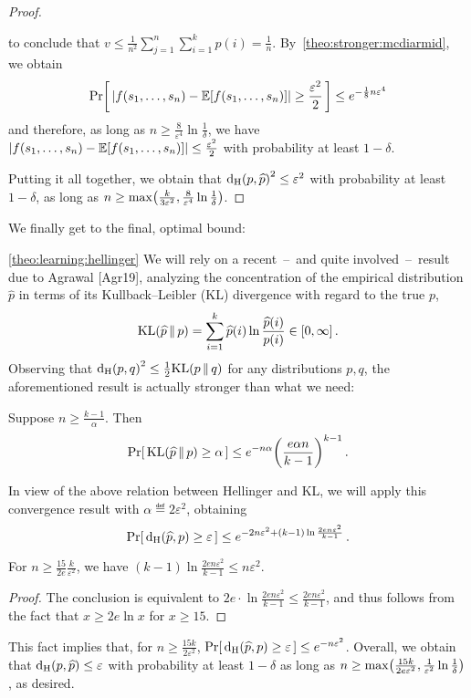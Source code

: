 \documentclass[10pt]{article}
\newcommand{\dst}{\varepsilon}
\newcommand{\ab}{k}
\newcommand{\ns}{n}
\begin{document}
\begin{proof}
\begin{itemize}
\[      \]
      to conclude that $v \leq \frac{1}{\ns^2} \sum_{j=1}^\ns \sum_{i=1}^\ab p(i)  = \frac{1}{\ns}$. By~\autoref{theo:stronger:mcdiarmid}, we obtain
      \[
          \probaOf{ \abs{f(s_1,\dots,s_\ns)-\expect{f(s_1,\dots,s_\ns)}} \geq \frac{\dst^2}{2} } \leq e^{-\frac{1}{8}\ns\dst^4}
      \]
      and therefore, as long as $\ns \geq \frac{8}{\dst^4}\ln\frac{1}{\delta}$, we have $\abs{f(s_1,\dots,s_\ns)-\expect{f(s_1,\dots,s_\ns)}} \leq \frac{\dst^2}{2}$ with probability at least $1-\delta$.
    \end{itemize}
    Putting it all together, we obtain that $\hellinger{p}{\widehat{p}}^2 \leq \dst^2$ with probability at least $1-\delta$, as long as $\ns \geq \max\mleft( \frac{\ab}{3\dst^2}, \frac{8}{\dst^4}\ln\frac{1}{\delta}\mright)$.
\end{proof}
\noindent We finally get to the final, optimal bound:
\begin{proofof}{\autoref{theo:learning:hellinger}}
We will rely on a recent~--~and quite involved~--~result due to Agrawal [Agr19], analyzing the concentration of the empirical distribution $\widehat{p}$ in terms of its Kullback--Leibler (KL) divergence with regard to the true $p$,
\[
    \kldiv{\widehat{p}}{p} = \sum_{i=1}^\ab \widehat{p}(i) \ln \frac{\widehat{p}(i)}{p(i)} \in[0,\infty]\,.
\]
Observing that $\hellinger{p}{q}^2 \leq \frac{1}{2} \kldiv{p}{q}$ for any distributions $p, q$, the aforementioned result is actually stronger than what we need:
\begin{theorem}
  Suppose $\ns \geq \frac{\ab-1}{\alpha}$. Then
  \[
      \probaOf{ \kldiv{\widehat{p}}{p} \geq \alpha } \leq e^{-\ns\alpha}\mleft(\frac{e\alpha\ns}{\ab-1}\mright)^{\ab-1}\,.
  \]
\end{theorem}
\noindent In view of the above relation between Hellinger and KL, we will apply this convergence result with $\alpha \eqdef 2\dst^2$, obtaining
  \[
      \probaOf{ \hellinger{\widehat{p}}{p} \geq \dst } \leq e^{-2\ns\dst^2 + (\ab-1)\ln\frac{2e\ns\dst^2}{\ab-1}}\,.
  \]
  \begin{fact}
      For $\ns \geq \frac{15}{2e}\frac{\ab}{\dst^2}$, we have $(\ab-1)\ln\frac{2e\ns\dst^2}{\ab-1}\leq \ns\dst^2$. 
  \end{fact}
  \begin{proof}
  The conclusion is equivalent to $2e\cdot\ln\frac{2e\ns\dst^2}{\ab-1}\leq \frac{2e\ns\dst^2}{\ab-1}$, and thus follows from the fact that $x\geq 2e \ln x$ for $x\geq 15$.
  \end{proof}
  \noindent This fact implies that, for $\ns \geq \frac{15\ab}{2\dst^2}$, $\probaOf{ \hellinger{\widehat{p}}{p} \geq \dst } \leq e^{-\ns\dst^2}$. Overall, we obtain that $\hellinger{p}{\widehat{p}} \leq \dst$ with probability at least $1-\delta$ as long as $\ns \geq \max\mleft( \frac{15\ab}{2e\dst^2}, \frac{1}{\dst^2}\ln\frac{1}{\delta}\mright)$, as desired.
\end{proofof}
\end{document}
